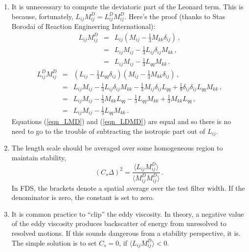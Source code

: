 \begin{enumerate}
\item
It is unnecessary to compute the deviatoric part of the Leonard term.  This is because, fortunately, $L_{ij} M_{ij}^D = L_{ij}^D M_{ij}^D$.  Here's the proof (thanks to Stas Borodai of Reaction Engineering International):
\begin{eqnarray}
L_{ij} M_{ij}^D &=& L_{ij} \left( M_{ij} - \frac{1}{3}M_{kk}\delta_{ij} \right) \,\mbox{,} \nonumber \\
&=& L_{ij} M_{ij} - \frac{1}{3} L_{ij}\delta_{ij} M_{kk} \,\mbox{,} \nonumber \\
\label{eqn_LMD} &=& L_{ij} M_{ij} - \frac{1}{3} L_{qq} M_{kk} \,\mbox{.}
\end{eqnarray}
\begin{eqnarray}
L_{ij}^D M_{ij}^D &=& \left( L_{ij} - \frac{1}{3}L_{qq}\delta_{ij} \right) \left( M_{ij} - \frac{1}{3}M_{kk}\delta_{ij} \right) \,\mbox{,} \nonumber \\
&=& L_{ij} M_{ij} - \frac{1}{3} L_{ij}\delta_{ij} M_{kk} - \frac{1}{3} M_{ij}\delta_{ij} L_{qq} + \frac{1}{9} \delta_{ij} \delta_{ij} L_{qq} M_{kk} \,\mbox{,} \nonumber \\
&=& L_{ij} M_{ij} - \frac{1}{3} M_{kk} L_{qq} - \frac{1}{3} L_{qq} M_{kk} + \frac{1}{3} M_{kk} L_{qq} \,\mbox{,} \nonumber \\
\label{eqn_LDMD} &=& L_{ij} M_{ij} - \frac{1}{3} L_{qq} M_{kk} \,\mbox{.}
\end{eqnarray}
Equations (\ref{eqn_LMD}) and (\ref{eqn_LDMD}) are equal and so there is no need to go to the trouble of subtracting the isotropic part out of $L_{ij}$.
\item
The length scale should be averaged over some homogeneous region to maintain stability,
\begin{equation}
\label{eqn_finallengthscale}
\left(C_s \Delta\right)^2 = \frac{ \langle L_{ij} M_{ij}^D \rangle}{ \langle M_{ij}^D M_{ij}^D \rangle } \,\mbox{.}
\end{equation}
In FDS, the brackets denote a spatial average over the test filter width.  If the denominator is zero, the constant is set to zero.
\item
It is common practice to ``clip'' the eddy viscosity.  In theory, a negative value of the eddy viscosity produces backscatter of energy from unresolved to resolved motions.  If this sounds dangerous from a stability perspective, it is.  The simple solution is to set $C_s = 0$, if $\langle L_{ij}M_{ij}^D \rangle < 0$.
\end{enumerate}


